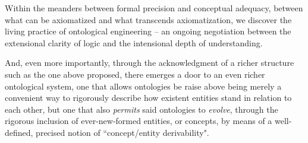 \documentclass[12pt,a4paper]{article}
\begin{document}
Within the meanders between formal precision and conceptual adequacy, between what can be axiomatized and what transcends axiomatization, we discover the living practice of ontological engineering -- an ongoing negotiation between the extensional clarity of logic and the intensional depth of understanding. 

And, even more importantly, through the acknowledgment of a richer structure such as the one above proposed, there emerges a door to an even richer ontological system, one that allows ontologies be raise above being merely a convenient way to rigorously describe how existent entities stand in relation to each other, but one that also \textit{permits} said ontologies to \textit{evolve}, through the rigorous inclusion of ever-new-formed entities, or concepts, by means of a well-defined, precised notion of ``concept/entity derivability".




\end{document}
